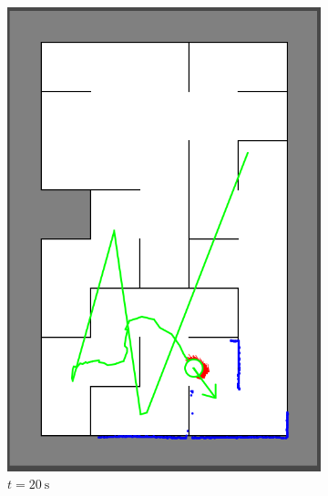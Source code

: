 \begin{figure}[H]
\begin{subfigure}{0.2\textwidth}
         \includegraphics[width=\textwidth]{figures/localization_20s.png}
         \caption{$t = \SI{20}{\second}$}
         \label{mapping20s}
     \end{subfigure}
     \hspace{1em}
     \begin{subfigure}{0.2\textwidth}
         \centering

\end{subfigure}
\end{figure}
